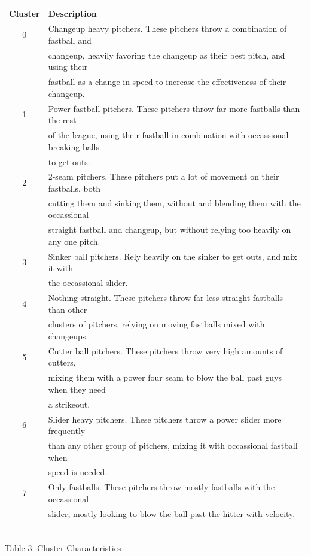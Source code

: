 \documentclass[12 pt]{article}
\begin{document}
\begin{center}
    \begin{tabular}{||c | l||} 
     \hline
     Cluster & Description  \\ [0.5ex] 
     \hline
     0 & Changeup heavy pitchers. These pitchers throw a combination of fastball and\\
     & changeup, heavily favoring the changeup as their best pitch, and using their\\
     & fastball as a change in speed to increase the effectiveness of their changeup.\\
     \hline 
     1 & Power fastball pitchers. These pitchers throw far more fastballs than the rest\\
     & of the league, using their fastball in combination with occassional breaking balls\\
     & to get outs.\\
     \hline
     2 & 2-seam pitchers. These pitchers put a lot of movement on their fastballs, both\\
     & cutting them and sinking them, without and blending them with the occassional\\ 
     & straight fastball and changeup, but without relying too heavily on any one pitch.\\
     \hline 
     3 & Sinker ball pitchers. Rely heavily on the sinker to get outs, and mix it with\\
     & the occassional slider.\\
     \hline 
     4 & Nothing straight. These pitchers throw far less straight fastballs than other\\ 
     & clusters of pitchers, relying on moving fastballs mixed with changeups.\\
     \hline
     5 & Cutter ball pitchers. These pitchers throw very high amounts of cutters,\\
     & mixing them with a power four seam to blow the ball past guys when they need\\
     & a strikeout.\\
     \hline 
     6 & Slider heavy pitchers. These pitchers throw a power slider more frequently\\
     & than any other group of pitchers, mixing it with occassional fastball when \\
     & speed is needed.\\
     \hline 
     7 & Only fastballs. These pitchers throw mostly fastballs with the occassional\\ 
     & slider, mostly looking to blow the ball past the hitter with velocity.\\
     \hline
    \end{tabular}
    \newline \\ Table 3: Cluster Characteristics
\end{center}
\end{document}
